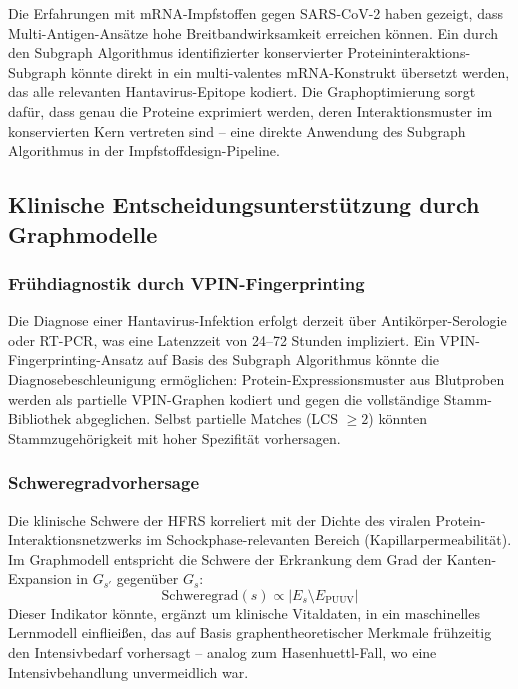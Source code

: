 ﻿\documentclass[a4paper,12pt]{article}
\theoremstyle{definition}
\begin{document}
Die Erfahrungen mit mRNA-Impfstoffen gegen SARS-CoV-2 haben gezeigt,
dass Multi-Antigen-Ans\"atze hohe Breitbandwirksamkeit erreichen k\"onnen.
Ein durch den Subgraph Algorithmus identifizierter konservierter
Proteininteraktions-Subgraph k\"onnte direkt in ein multi-valentes
mRNA-Konstrukt \"ubersetzt werden, das alle relevanten Hantavirus-Epitope
kodiert. Die Graphoptimierung sorgt daf\"ur, dass genau die Proteine
exprimiert werden, deren Interaktionsmuster im konservierten Kern
vertreten sind -- eine direkte Anwendung des Subgraph Algorithmus
in der Impfstoffdesign-Pipeline.

\subsection{Klinische Entscheidungsunterst\"utzung durch Graphmodelle}

\subsubsection{Fr\"uhdiagnostik durch VPIN-Fingerprinting}

Die Diagnose einer Hantavirus-Infektion erfolgt derzeit \"uber
Antik\"orper-Serologie oder RT-PCR, was eine Latenzzeit von
24--72 Stunden impliziert. Ein VPIN-Fingerprinting-Ansatz auf
Basis des Subgraph Algorithmus k\"onnte die Diagnosebeschleunigung
erm\"oglichen: Protein-Expressionsmuster aus Blutproben werden als
partielle VPIN-Graphen kodiert und gegen die vollst\"andige
Stamm-Bibliothek abgeglichen. Selbst partielle Matches (LCS $\geq 2$)
k\"onnten Stammzugeh\"origkeit mit hoher Spezifit\"at vorhersagen.

\subsubsection{Schweregradvorhersage}

Die klinische Schwere der HFRS korreliert mit der Dichte des viralen
Protein-Interaktionsnetzwerks im Schockphase-relevanten Bereich
(Kapillarpermeabilit\"at). Im Graphmodell entspricht die Schwere
der Erkrankung dem Grad der Kanten-Expansion in $G_{s'}$ gegen\"uber $G_s$:
\[
    \text{Schweregrad}(s) \propto |E_s \setminus E_{\mathrm{PUUV}}|
\]
Dieser Indikator k\"onnte, erg\"anzt um klinische Vitaldaten, in ein
maschinelles Lernmodell einfliei{\ss}en, das auf Basis graphentheoretischer
Merkmale fr\"uhzeitig den Intensivbedarf vorhersagt -- analog zum
Hasenhuettl-Fall, wo eine Intensivbehandlung unvermeidlich war.
\end{document}
